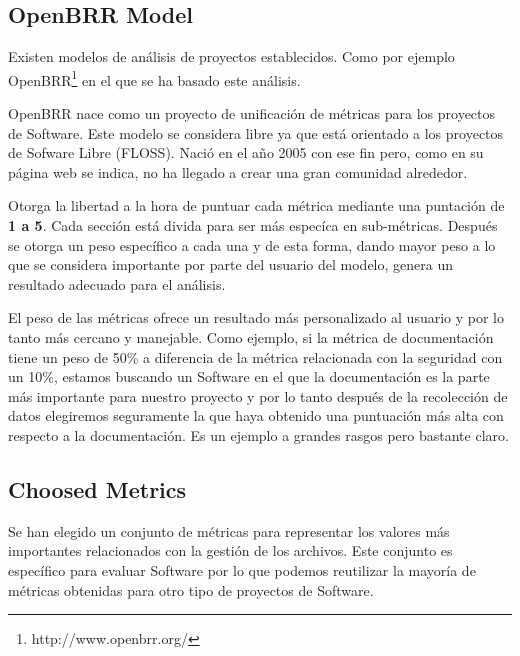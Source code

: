 \documentclass[11pt]{scrartcl}
\begin{document}
\subsection{OpenBRR Model}

\par Existen modelos de an\'alisis de proyectos establecidos. Como por ejemplo OpenBRR\footnote{http://www.openbrr.org/} en el que se ha basado este an\'alisis. 

\par OpenBRR nace como un proyecto de unificaci\'on de m\'etricas para los proyectos de Software. Este modelo se considera libre ya que est\'a orientado a los proyectos de Sofware Libre (FLOSS). Naci\'o en el a\~no 2005 con ese fin pero, como en su p\'agina web se indica, no ha llegado a crear una gran comunidad alrededor.

\par Otorga la libertad a la hora de puntuar cada m\'etrica mediante una puntaci\'on de \textbf{1 a 5}. Cada secci\'on est\'a divida para ser m\'as espec\'ica en sub-m\'etricas. Despu\'es se otorga un peso espec\'ifico a cada una y de esta forma, dando mayor peso a lo que se considera importante por parte del usuario del modelo, genera un resultado adecuado para el an\'alisis.

\par El peso de las m\'etricas ofrece un resultado m\'as personalizado al usuario y por lo tanto m\'as cercano y manejable. Como ejemplo, si la m\'etrica de documentaci\'on tiene un peso de 50\% a diferencia de la m\'etrica relacionada con la seguridad con un 10\%, estamos buscando un Software en el que la documentaci\'on es la parte m\'as importante para nuestro proyecto y por lo tanto despu\'es de la recolecci\'on de datos elegiremos seguramente la que haya obtenido una puntuaci\'on m\'as alta con respecto a la documentaci\'on. Es un ejemplo a grandes rasgos pero bastante claro.

\subsection{Choosed Metrics}

\par Se han elegido un conjunto de m\'etricas para representar los valores m\'as importantes relacionados con la gesti\'on de los archivos. Este conjunto es espec\'ifico para evaluar Software por lo que podemos reutilizar la mayor\'ia de m\'etricas obtenidas para otro tipo de proyectos de Software.
\end{document}
